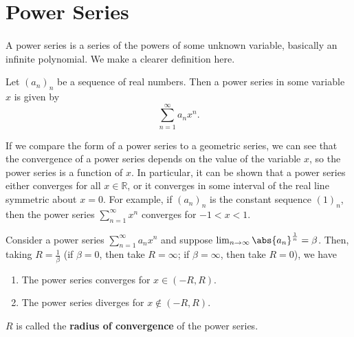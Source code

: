 \documentclass[../real_analysis.tex]{subfiles}
\begin{document}
    \section{Power Series}
        \paragraph{}
        A power series is a series of the powers of some unknown variable, basically an infinite polynomial. We make a clearer definition here.
        \begin{definition}
            Let $(a_n)_n$ be a sequence of real numbers. Then a power series in some variable $x$ is given by
            \begin{equation*}
                \sum_{n=1}^\infty a_nx^n.
            \end{equation*}
        \end{definition}
        If we compare the form of a power series to a geometric series, we can see that the convergence of a power series depends on the value of the variable $x$, so the power series is a function of $x$. In particular, it can be shown that a power series either converges for all $x\in\mathbb{R}$, or it converges in some interval of the real line symmetric about $x=0$. For example, if $(a_n)_n$ is the constant sequence $(1)_n$, then the power series $\sum_{n=1}^\infty x^n$ converges for $-1<x<1$.
        \begin{theorem}
            Consider a power series $\sum_{n=1}^\infty a_nx^n$ and suppose $\lim_{n\to\infty}\abs{a_n}^\frac{1}{n}=\beta$. Then, taking $R=\frac{1}{\beta}$ (if $\beta=0$, then take $R=\infty$; if $\beta=\infty$, then take $R=0$), we have
            \begin{enumerate}[label={\upshape(\roman*)}]
                \item The power series converges for $x\in(-R, R)$.
                \item The power series diverges for $x\notin(-R, R)$.
            \end{enumerate}
            $R$ is called the \textbf{radius of convergence} of the power series.
        \end{theorem}
\end{document}
